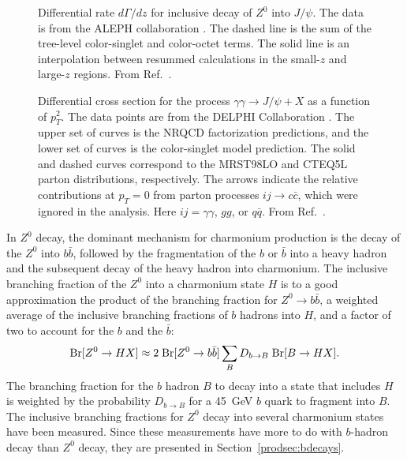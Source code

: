 \begin{figure}[ht]
\begin{center}
\caption{
Differential rate $d \Gamma/ dz$ for inclusive decay of $Z^0$ 
into $J/\psi$. The data is from the ALEPH collaboration 
\cite{ALEPH:1997zj}.  The dashed line is the sum of the tree-level 
color-singlet and color-octet terms.  The solid line  is an 
interpolation between resummed calculations in the small-$z$ 
and large-$z$ regions. From Ref.~\cite{Boyd:1998km}. 
}
\label{fig-boyd-lep}
\end{center}
\end{figure}

\begin{figure}[ht]
\begin{center}
\caption{
Differential cross section for the process ${\gamma
\gamma\rightarrow J/\psi +X}$ as a function of $p_T^2$. 
The data points are from the DELPHI Collaboration
\cite{Todorova-Nova:2001pt,Abdallah:2003du}. The upper set of curves is the
NRQCD factorization predictions, and the lower set of curves is the
color-singlet model prediction. The solid and dashed curves correspond
to the MRST98LO \cite{Martin:1998sq} and CTEQ5L \cite{Lai:1999wy} parton
distributions, respectively. The arrows indicate the relative
contributions at $p_T=0$ from parton processes $ij \to c \bar c$,
which were ignored in the analysis. 
Here $ij = \gamma \gamma$, $gg$, or $q \bar q$. 
From Ref.~\cite{Klasen:2001cu}.}
\label{fig-gamma-gamma-psi}
\end{center}
\end{figure}


In $Z^0$ decay, the dominant mechanism for charmonium production is the 
decay of the $Z^0$ into $b \bar b$, followed by the fragmentation 
of the $b$ or $\bar b$ into a heavy hadron and the subsequent
decay of the heavy hadron into charmonium.
The inclusive branching fraction of the $Z^0$ into a charmonium state
$H$ is to a good approximation the product of the branching fraction 
for $Z^0 \to b \bar b$, a weighted average of the inclusive branching 
fractions of $b$ hadrons into $H$, and a factor of two to account for the 
$b$ and the $\bar b$:
%
\begin{equation}
{\rm Br}[ Z^0 \to H X] \approx 
2 \; {\rm Br}[ Z^0 \to b \bar b ] \sum_B D_{b \to B} \; {\rm Br}[B \to H X].
\end{equation}
%
The branching fraction for the $b$ hadron $B$ to decay into 
a state that includes $H$ is weighted by the probability 
$D_{b \to B}$ for a 45~GeV $b$ quark to fragment into $B$.
The inclusive branching fractions for $Z^0$ decay into several 
charmonium states have been measured.
Since these measurements have more to do with $b$-hadron decay
than $Z^0$ decay, they are presented in Section~\ref{prodsec:bdecays}.

